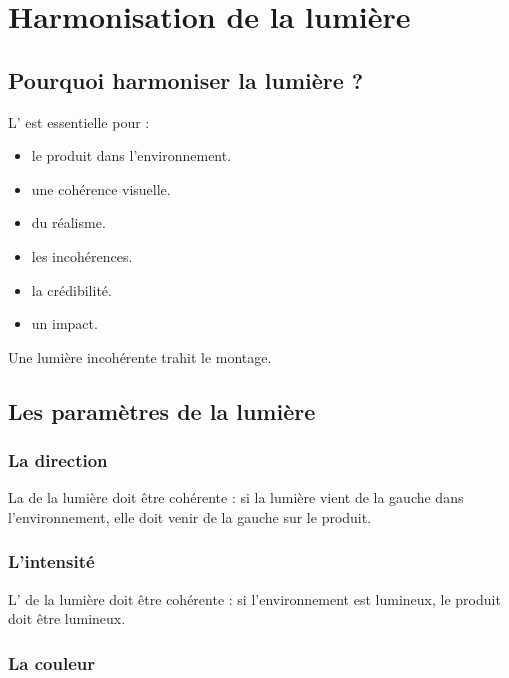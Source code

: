 \section{Harmonisation de la lumière}

\subsection{Pourquoi harmoniser la lumière ?}

L' est essentielle pour :

\begin{itemize}
    \item {} le produit dans l'environnement.
    \item {} une cohérence visuelle.
    \item {} du réalisme.
    \item {} les incohérences.
    \item {} la crédibilité.
    \item {} un impact.
\end{itemize}

Une lumière incohérente trahit le montage.

\subsection{Les paramètres de la lumière}

\subsubsection{La direction}

La  de la lumière doit être cohérente : si la lumière vient de la gauche dans l'environnement, elle doit venir de la gauche sur le produit.

\subsubsection{L'intensité}

L' de la lumière doit être cohérente : si l'environnement est lumineux, le produit doit être lumineux.

\subsubsection{La couleur}

